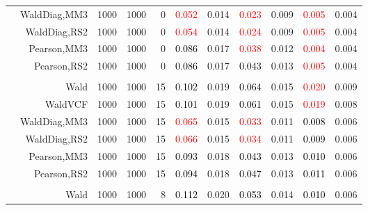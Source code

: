 \documentclass[
]{article}
\begin{document}
\begin{table}[H]
{\begin{tabular}[t]{lrrrrrrrlrr}
\hspace{1em} & WaldDiag,MM3 & 1000 & 1000 & 0 & \textcolor{red}{0.052} & 0.014 & \textcolor{red}{0.023} & 0.009 & \textcolor{red}{0.005} & 0.004\\

\hspace{1em} & WaldDiag,RS2 & 1000 & 1000 & 0 & \textcolor{red}{0.054} & 0.014 & \textcolor{red}{0.024} & 0.009 & \textcolor{red}{0.005} & 0.004\\

\hspace{1em} & Pearson,MM3 & 1000 & 1000 & 0 & \textcolor{black}{0.086} & 0.017 & \textcolor{red}{0.038} & 0.012 & \textcolor{red}{0.004} & 0.004\\

\hspace{1em} & Pearson,RS2 & 1000 & 1000 & 0 & \textcolor{black}{0.086} & 0.017 & \textcolor{black}{0.043} & 0.013 & \textcolor{red}{0.005} & 0.004\\
\cmidrule{1-11}
\addlinespace[0.3em]
\multicolumn{11}{l}{\textbf{1F 15V}}\\
\hspace{1em} & Wald & 1000 & 1000 & 15 & \textcolor{black}{0.102} & 0.019 & \textcolor{black}{0.064} & 0.015 & \textcolor{red}{0.020} & 0.009\\

\hspace{1em} & WaldVCF & 1000 & 1000 & 15 & \textcolor{black}{0.101} & 0.019 & \textcolor{black}{0.061} & 0.015 & \textcolor{red}{0.019} & 0.008\\

\hspace{1em} & WaldDiag,MM3 & 1000 & 1000 & 15 & \textcolor{red}{0.065} & 0.015 & \textcolor{red}{0.033} & 0.011 & \textcolor{black}{0.008} & 0.006\\

\hspace{1em} & WaldDiag,RS2 & 1000 & 1000 & 15 & \textcolor{red}{0.066} & 0.015 & \textcolor{red}{0.034} & 0.011 & \textcolor{black}{0.009} & 0.006\\

\hspace{1em} & Pearson,MM3 & 1000 & 1000 & 15 & \textcolor{black}{0.093} & 0.018 & \textcolor{black}{0.043} & 0.013 & \textcolor{black}{0.010} & 0.006\\

\hspace{1em} & Pearson,RS2 & 1000 & 1000 & 15 & \textcolor{black}{0.094} & 0.018 & \textcolor{black}{0.047} & 0.013 & \textcolor{black}{0.011} & 0.006\\
\cmidrule{1-11}
\addlinespace[0.3em]
\multicolumn{11}{l}{\textbf{2F 10V}}\\
\hspace{1em} & Wald & 1000 & 1000 & 8 & \textcolor{black}{0.112} & 0.020 & \textcolor{black}{0.053} & 0.014 & \textcolor{black}{0.010} & 0.006\\


\end{tabular}}
\end{table}
\end{document}
